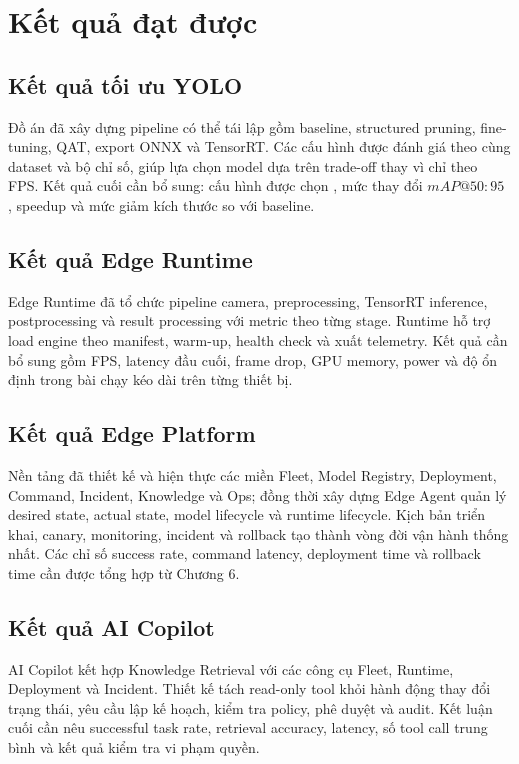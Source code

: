 \section{Kết quả đạt được}

\subsection{Kết quả tối ưu YOLO}

Đồ án đã xây dựng pipeline có thể tái lập gồm baseline, structured pruning,
fine-tuning, QAT, export ONNX và TensorRT. Các cấu hình được đánh giá theo cùng
dataset và bộ chỉ số, giúp lựa chọn model dựa trên trade-off thay vì chỉ theo FPS.
Kết quả cuối cần bổ sung: cấu hình được chọn , mức thay đổi
$mAP@50{:}95$ , speedup  và mức giảm kích thước
 so với baseline.

\subsection{Kết quả Edge Runtime}

Edge Runtime đã tổ chức pipeline camera, preprocessing, TensorRT inference,
postprocessing và result processing với metric theo từng stage. Runtime hỗ trợ
load engine theo manifest, warm-up, health check và xuất telemetry. Kết quả cần
bổ sung gồm FPS, latency đầu cuối, frame drop, GPU memory, power và độ ổn định
trong bài chạy kéo dài trên từng thiết bị.

\subsection{Kết quả Edge Platform}

Nền tảng đã thiết kế và hiện thực các miền Fleet, Model Registry, Deployment,
Command, Incident, Knowledge và Ops; đồng thời xây dựng Edge Agent quản lý
desired state, actual state, model lifecycle và runtime lifecycle. Kịch bản triển
khai, canary, monitoring, incident và rollback tạo thành vòng đời vận hành thống
nhất. Các chỉ số success rate, command latency, deployment time và rollback time
cần được tổng hợp từ Chương 6.

\subsection{Kết quả AI Copilot}

AI Copilot kết hợp Knowledge Retrieval với các công cụ Fleet, Runtime,
Deployment và Incident. Thiết kế tách read-only tool khỏi hành động thay đổi
trạng thái, yêu cầu lập kế hoạch, kiểm tra policy, phê duyệt và audit. Kết luận cuối
cần nêu successful task rate, retrieval accuracy, latency, số tool call trung bình
và kết quả kiểm tra vi phạm quyền.